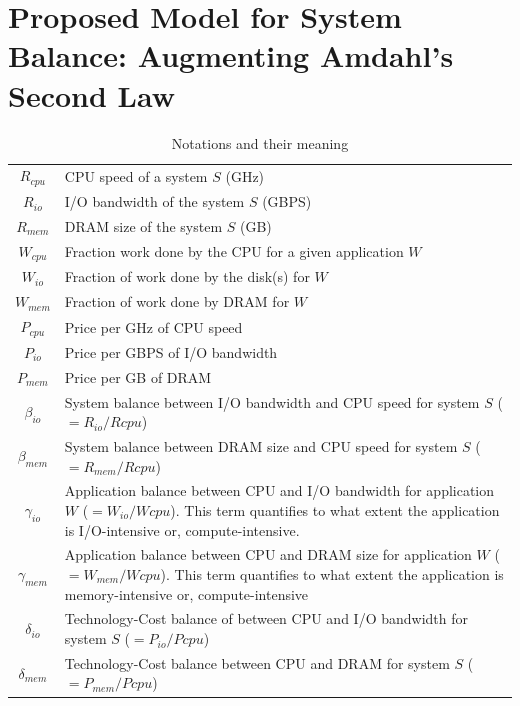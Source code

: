 \documentclass[journal]{IEEEtran}
\begin{document}
\section{Proposed Model for System Balance: Augmenting Amdahl's Second Law}
\begin{table}[!t]
\caption{Notations and their meaning}
\label{tab:Notation}
\centering
\begin{tabular}{|c|p{7cm}|}
\hline
$R_{cpu}$ & CPU speed of a system $S$ (GHz)\\
$R_{io}$ &  I/O bandwidth of the system $S$ (GBPS)\\
$R_{mem}$ & DRAM size of the system $S$ (GB)\\
\hline
$W_{cpu}$ & Fraction work done by the CPU for a given application $W$\\
$W_{io}$ & Fraction of work done by the disk(s) for $W$\\
$W_{mem}$ & Fraction of work done by DRAM for $W$\\
\hline
$P_{cpu}$ & Price per GHz of CPU speed\\
$P_{io}$ & Price per GBPS of I/O bandwidth\\
$P_{mem}$ & Price per GB of DRAM\\
\hline
\hline
$\beta_{io}$ & System balance between I/O bandwidth and CPU speed for system $S$ ($= R_{io}/R{cpu}$)\\
$\beta_{mem}$ & System balance between DRAM size and CPU speed for system $S$ ($= R_{mem}/R{cpu}$)\\
\hline
$\gamma_{io}$ & Application balance between CPU and I/O bandwidth for application $W$ ($= W_{io}/W{cpu}$). This term quantifies to what extent the application is I/O-intensive or, compute-intensive. \\
$\gamma_{mem}$ & Application balance between CPU and DRAM size for application $W$ ($= W_{mem}/W{cpu}$). This term quantifies to what extent the application is memory-intensive or, compute-intensive\\
\hline
$\delta_{io}$ & Technology-Cost balance of between CPU and I/O bandwidth for system $S$ ($= P_{io}/P{cpu}$)\\
$\delta_{mem}$ & Technology-Cost balance between CPU and DRAM for system $S$ ($= P_{mem}/P{cpu}$)\\
\hline
\end{tabular}
\end{table}
\end{document}
